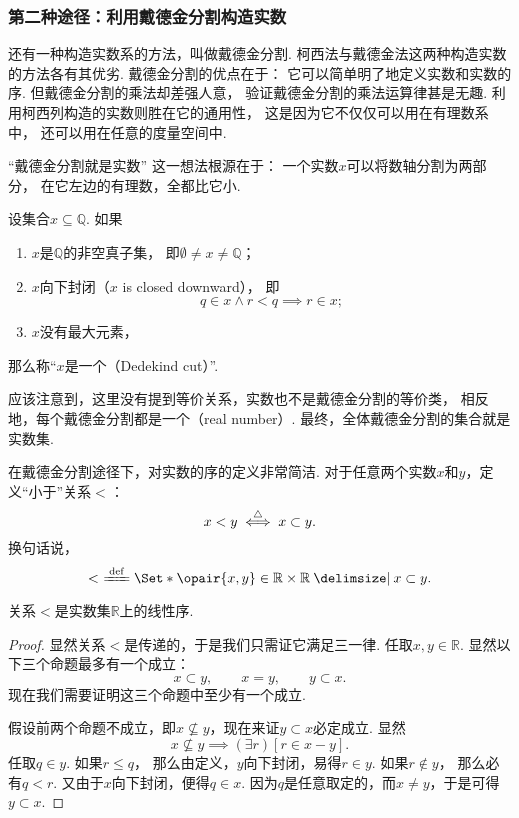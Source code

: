 \subsubsection*{第二种途径：利用戴德金分割构造实数}
还有一种构造实数系的方法，叫做戴德金分割.
柯西法与戴德金法这两种构造实数的方法各有其优劣.
戴德金分割的优点在于：
它可以简单明了地定义实数和实数的序.
但戴德金分割的乘法却差强人意，
验证戴德金分割的乘法运算律甚是无趣.
利用柯西列构造的实数则胜在它的通用性，
这是因为它不仅仅可以用在有理数系中，
还可以用在任意的度量空间中.

“戴德金分割就是实数”
这一想法根源在于：
一个实数\(x\)可以将数轴分割为两部分，
在它左边的有理数，全都比它小.

\begin{definition}
设集合\(x \subseteq \mathbb{Q}\).
如果\begin{enumerate}
	\item \(x\)是\(\mathbb{Q}\)的非空真子集，
	即\(\emptyset \neq x \neq \mathbb{Q}\)；

	\item \(x\)向下封闭（\(x\) is closed downward），
	即\[
		q \in x \land r < q \implies r \in x;
	\]

	\item \(x\)没有最大元素，
\end{enumerate}
那么称“\(x\)是一个（Dedekind cut）”.
\end{definition}

应该注意到，这里没有提到等价关系，实数也不是戴德金分割的等价类，
相反地，每个戴德金分割都是一个（real number）.
最终，全体戴德金分割的集合就是实数集.

在戴德金分割途径下，对实数的序的定义非常简洁.
对于任意两个实数\(x\)和\(y\)，定义“小于”关系\(<\)：\[
	x < y \overset{\triangle}{\iff} x \subset y.
\]
换句话说，\[
	<\ \defeq \Set*{ \opair{x,y}\in\mathbb{R}\times\mathbb{R} \given x \subset y }.
\]

\begin{theorem}
关系\(<\)是实数集\(\mathbb{R}\)上的线性序.
\begin{proof}
显然关系\(<\)是传递的，于是我们只需证它满足三一律.
任取\(x,y\in\mathbb{R}\).
显然以下三个命题最多有一个成立：\[
	x \subset y, \qquad
	x = y, \qquad
	y \subset x.
\]
现在我们需要证明这三个命题中至少有一个成立.

假设前两个命题不成立，即\(x \nsubseteq y\)，现在来证\(y \subset x\)必定成立.
显然\[
	x \nsubseteq y
	\implies
	(\exists r)[r \in x-y].
\]
任取\(q \in y\).
如果\(r \leq q\)，
那么由定义，\(y\)向下封闭，易得\(r \in y\).
如果\(r \notin y\)，
那么必有\(q < r\).
又由于\(x\)向下封闭，便得\(q \in x\).
因为\(q\)是任意取定的，而\(x \neq y\)，于是可得\(y \subset x\).
\end{proof}
\end{theorem}

